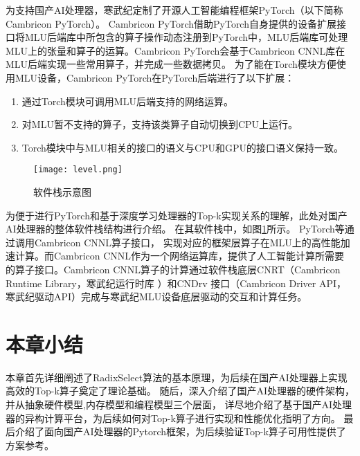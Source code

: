 为支持国产AI处理器，寒武纪定制了开源人工智能编程框架PyTorch（以下简称Cambricon PyTorch）。
Cambricon PyTorch借助PyTorch自身提供的设备扩展接口将MLU后端库中所包含的算子操作动态注册到PyTorch中，MLU后端库可处理MLU上的张量和算子的运算。Cambricon PyTorch会基于Cambricon CNNL库在MLU后端实现一些常用算子，并完成一些数据拷贝。
为了能在Torch模块方便使用MLU设备，Cambricon PyTorch在PyTorch后端进行了以下扩展：
\begin{enumerate} 
\item 通过Torch模块可调用MLU后端支持的网络运算。

\item 对MLU暂不支持的算子，支持该类算子自动切换到CPU上运行。

\item Torch模块中与MLU相关的接口的语义与CPU和GPU的接口语义保持一致。
\end{enumerate}
\begin{figure}[ht]
  \centering
  \texttt{[image: level.png]}
  \caption{软件栈示意图}
  \label{fig:level}
  \note{}
\end{figure}
为便于进行PyTorch和基于深度学习处理器的Top-k实现关系的理解，此处对国产AI处理器的整体软件栈结构进行介绍。
在其软件栈中，如图\ref{fig:level}所示。
PyTorch等通过调用Cambricon CNNL算子接口，
实现对应的框架层算子在MLU上的高性能加速计算。而Cambricon CNNL作为一个网络运算库，提供了人工智能计算所需要
的算子接口。Cambricon CNNL算子的计算通过软件栈底层CNRT（Cambricon Runtime Library，寒武纪运行时库
）和CNDrv 接口（Cambricon Driver API，寒武纪驱动API）完成与寒武纪MLU设备底层驱动的交互和计算任务。






\section{本章小结}
本章首先详细阐述了RadixSelect算法的基本原理，为后续在国产AI处理器上实现高效的Top-k算子奠定了理论基础。
随后，深入介绍了国产AI处理器的硬件架构，并从抽象硬件模型,内存模型和编程模型三个层面，
详尽地介绍了基于国产AI处理器的异构计算平台，为后续如何对Top-k算子进行实现和性能优化指明了方向。
最后介绍了面向国产AI处理器的Pytorch框架，为后续验证Top-k算子可用性提供了方案参考。